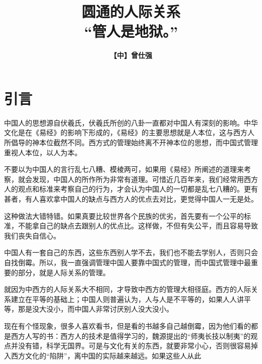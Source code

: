 \documentclass[fontset=fandol, a4paper, 12pt, openright]{ctexbook}
\title{\Huge \textbf{圆通的人际关系}\\ \Large “管人是地狱。”}
\author{\textbf{【中】曾仕强}}
\date{}
\begin{document}
\frontmatter

\maketitle


\tableofcontents




\chapter*{引言}
中国人的思想源自伏羲氏，伏羲氏所创的八卦一直都对中国人有深刻的影响。中华文化是在《易经》的影响下形成的，《易经》的主要思想就是人本位，这与西方人所倡导的神本位截然不同。西方式的管理始终离不开神本位的思想，而中国式管理重视人本位，以人为本。

不要以为中国人的言行乱七八糟、模棱两可，如果用《易经》所阐述的道理来考察，就会发现，中国人的所作所为非常有道理。可惜近几百年来，我们经常用西方人的观点和标准来考察自己的行为，才会认为中国人的一切都是乱七八糟的。更有甚者，有人喜欢拿中国人的缺点与西方人的优点去对比，更觉得中国人一无是处。

这种做法大错特错。如果真要比较世界各个民族的优劣，首先要有一个公平的标准，不能拿自己的缺点去跟别人的优点比。这样做，不但有失公平，而且容易导致我们丧失自信心。

中国人有一套自己的东西，这些东西别人学不去，我们也不能去学别人，否则只会自找倒霉。所以，我一直强调管理中国人要靠中国式的管理，而中国式管理中最重要的部分，就是人际关系的管理。

就因为中西方的人际关系大不相同，才导致中西方的管理大相径庭。西方的人际关系建立在平等的基础上；中国人则普遍认为，人与人是不平等的，如果人人讲平等，那是没大没小，而中国人非常讨厌别人没大没小。

现在有个怪现象，很多人喜欢看书，但是看的书越多自己越倒霉，因为他们看的都是西方人写的书：西方人的技术是值得学习的，魏源提出的“师夷长技以制夷”的观点并没有错，科学无国界。可是与文化有关的东西，就要非常小心，否则很容易掉入西方文化的“陷阱”，离中国的实际越来越远。如果这些人从此
\end{document}
